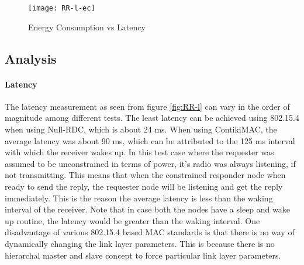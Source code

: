 \begin{figure}[h]
\texttt{[image: RR-l-ec]}
\caption{Energy Consumption vs Latency}
\label{fig:RR-l-ec}
\end{figure}

\subsection{Analysis}
\paragraph{Latency}
The latency measurement as seen from figure \ref{fig:RR-l} can vary in the order of magnitude among different tests. The least latency can be achieved using 802.15.4 when using Null-RDC, which is about 24 ms.  When using ContikiMAC, the average latency was about 90 ms, which can be attributed to the 125 ms interval with which the receiver wakes up. In this test case where the requester was assumed to be unconstrained in terms of power, it's radio was always listening, if not transmitting. This means that when the constrained responder node when ready to send the reply, the requester node will be listening and get the reply immediately. This is the reason the average latency is less than the waking interval of the receiver. Note that in case both the nodes have a sleep and wake up routine, the latency would be greater than the waking interval. One disadvantage of various 802.15.4 based MAC standards is that there is no way of dynamically changing the link layer parameters. This is because there is no hierarchal master and slave concept to force particular link layer parameters.

